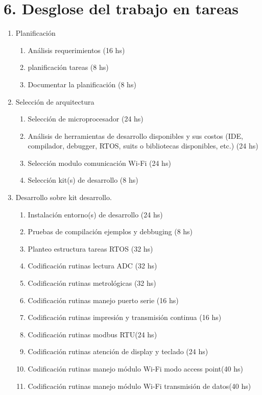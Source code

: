\documentclass[11pt]{charter}
\begin{document}
\section{6. Desglose del trabajo en tareas}
\label{sec:wbs}



\begin{enumerate}
\item Planificación
	\begin{enumerate}
	\item Análisis requerimientos (16 hs)
	\item planificación tareas (8 hs)
	\item Documentar la planificación (8 hs)
	\end{enumerate}
\item Selección de arquitectura
	\begin{enumerate}
	\item Selección de microprocesador (24 hs)
	\item Análisis de herramientas de desarrollo disponibles y sus costos (IDE, compilador, debugger, RTOS, suits o bibliotecas disponibles, etc.) (24 hs)
	\item Selección modulo comunicación Wi-Fi (24 hs)
	\item Selección kit(s) de desarrollo (8 hs)
	\end{enumerate}
\item Desarrollo sobre kit desarrollo.
	\begin{enumerate}
	\item Instalación entorno(s) de desarrollo (24 hs)
	\item Pruebas de compilación ejemplos y debbuging (8 hs)
	\item Planteo estructura tareas RTOS	(32 hs)
	\item Codificación rutinas lectura ADC (32 hs)
	\item Codificación rutinas metrológicas (32 hs)
	\item Codificación rutinas manejo puerto serie (16 hs)
	\item Codificación rutinas impresión y transmisión continua (16 hs)
	\item Codificación rutinas modbus RTU(24 hs)
	\item Codificación rutinas atención de display y teclado (24 hs)
	\item Codificación rutinas manejo módulo Wi-Fi modo access point(40 hs)
	\item Codificación rutinas manejo módulo Wi-Fi transmisión de datos(40 hs)

\end{enumerate}
\end{enumerate}
\end{document}
